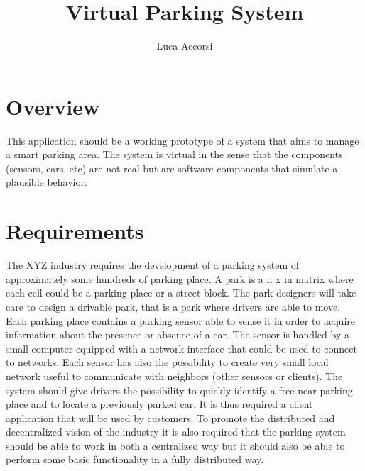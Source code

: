 \documentclass[11pt]{article}
\title{\textbf{Virtual Parking System}}
\author{Luca Accorsi}
\date{}
\begin{document}
\maketitle

\section{Overview}
This application should be a working prototype of a system that aims to manage a smart parking area. The system is virtual in the sense that the components (sensors, cars, etc) are not real but are software components that simulate a plausible behavior.

\section{Requirements}
The XYZ industry requires the development of a parking system of approximately some hundreds of parking place. A park is a n x m matrix where each cell could be a parking place or a street block. The park designers will take care to design a drivable park, that is a park where drivers are able to move. Each parking place contains a parking sensor able to sense it in order to acquire information about the presence or absence of a car. The sensor is handled by a small computer equipped with a network interface that could be used to connect to networks. Each sensor has also the possibility to create very small local network useful to communicate with neighbors (other sensors or clients). The system should give drivers the possibility to quickly identify a free near parking place and to locate a previously parked car. It is thus required a client application that will be used by customers. To promote the distributed and decentralized vision of the industry it is also required that the parking system should be able to work in both a centralized way but it should also be able to perform some basic functionality in a fully distributed way.
\end{document}
